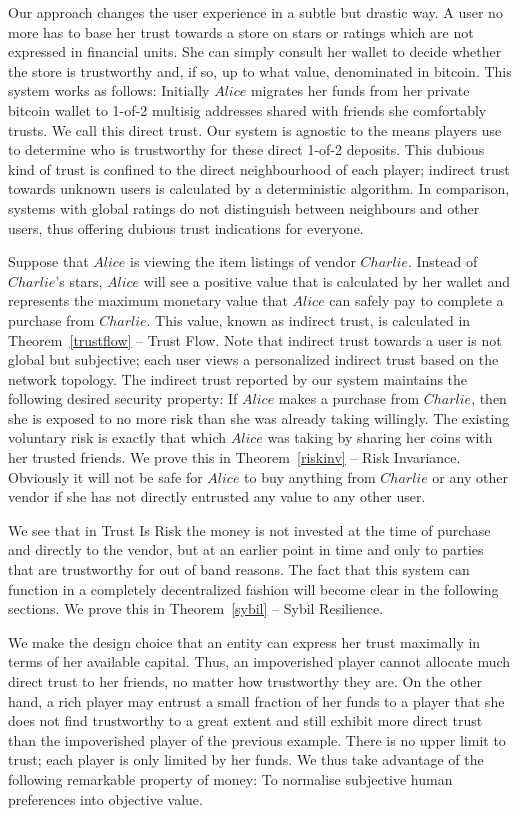   Our approach changes the user experience in a subtle but drastic way. A user no more has to base her trust towards a
  store on stars or ratings which are not expressed in financial units. She can simply consult her wallet to decide whether
  the store is trustworthy and, if so, up to what value, denominated in bitcoin. This system works as follows: Initially
  $Alice$ migrates her funds from her private bitcoin wallet to 1-of-2 multisig addresses shared with friends she
  comfortably trusts. We call this direct trust. Our system is agnostic to the means players use to determine who is
  trustworthy for these direct 1-of-2 deposits. This dubious kind of trust is confined to the direct neighbourhood of each
  player; indirect trust towards unknown users is calculated by a deterministic algorithm. In comparison, systems with global
  ratings do not distinguish between neighbours and other users, thus offering dubious trust indications for everyone.

  Suppose that $Alice$ is viewing the item listings of vendor $Charlie$. Instead of $Charlie$'s stars, $Alice$ will see a
  positive value that is calculated by her wallet and represents the maximum monetary value that $Alice$ can safely pay to
  complete a purchase from $Charlie$. This value, known as indirect trust, is calculated in Theorem~\ref{trustflow} -- Trust
  Flow. Note that indirect trust towards a user is not global but subjective; each user views a personalized indirect trust
  based on the network topology. The indirect trust reported by our system maintains the following desired security property:
  If $Alice$ makes a purchase from $Charlie$, then she is exposed to no more risk than she was already taking willingly. The
  existing voluntary risk is exactly that which $Alice$ was taking by sharing her coins with her trusted friends. We prove
  this in Theorem~\ref{riskinv} -- Risk Invariance. Obviously it will not be safe for $Alice$ to buy anything from $Charlie$
  or any other vendor if she has not directly entrusted any value to any other user.

  We see that in Trust Is Risk the money is not invested at the time of purchase and directly to the vendor, but at an
  earlier point in time and only to parties that are trustworthy for out of band reasons. The fact that this system can
  function in a completely decentralized fashion will become clear in the following sections. We prove this in
  Theorem~\ref{sybil} -- Sybil Resilience.

  We make the design choice that an entity can express her trust maximally in terms of her available capital. Thus, an
  impoverished player cannot allocate much direct trust to her friends, no matter how trustworthy they are. On the other hand,
  a rich player may entrust a small fraction of her funds to a player that she does not find trustworthy to a great extent and
  still exhibit more direct trust than the impoverished player of the previous example. There is no upper limit to trust; each
  player is only limited by her funds. We thus take advantage of the following remarkable property of money: To normalise
  subjective human preferences into objective value.

